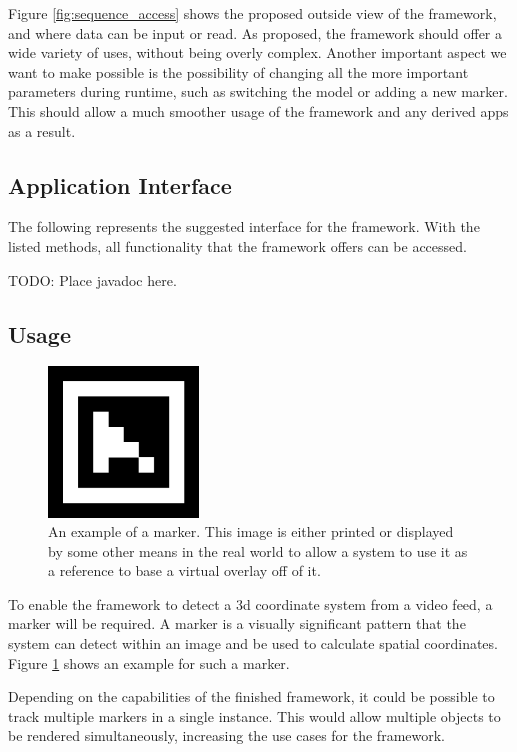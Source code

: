 Figure \ref{fig:sequence_access} shows the proposed outside view of the framework, and where data can be input or read.
As proposed, the framework should offer a wide variety of uses, without being overly complex.
Another important aspect we want to make possible is the possibility of changing all the more important parameters during runtime, such as switching the model or adding a new marker.
This should allow a much smoother usage of the framework and any derived apps as a result.

\subsection{Application Interface}

The following represents the suggested interface for the framework.
With the listed methods, all functionality that the framework offers can be accessed.

TODO: Place javadoc here.

\subsection{Usage}

\begin{figure}
	\centering
	\includegraphics[width=4cm]{images/marker_example.png}
	\caption[Example Marker.]{An example of a marker. This image is either printed or displayed by some other means in the real world to allow a system to use it as a reference to base a virtual overlay off of it.}
	\label{fig:marker_example}
\end{figure}

To enable the framework to detect a 3d coordinate system from a video feed, a marker will be required.
A marker is a visually significant pattern that the system can detect within an image and be used to calculate spatial coordinates. Figure \ref{fig:marker_example} shows an example for such a marker.

Depending on the capabilities of the finished framework, it could be possible to track multiple markers in a single instance.
This would allow multiple objects to be rendered simultaneously, increasing the use cases for the framework.
